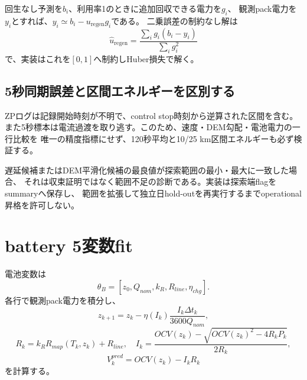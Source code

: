 
回生なし予測を$b_i$、利用率1のときに追加回収できる電力を$g_i$、
観測pack電力を$y_i$とすれば、$y_i\simeq b_i-u_{\mathrm{regen}}g_i$である。
二乗誤差の制約なし解は
\[
\hat u_{\mathrm{regen}}=
\frac{\sum_i g_i(b_i-y_i)}{\sum_i g_i^2}
\]
で、実装はこれを$[0,1]$へ制約しHuber損失で解く。


\subsection{5秒同期誤差と区間エネルギーを区別する}
ZPログは記録開始時刻が不明で、control stop時刻から逆算された区間を含む。
また5秒標本は電流過渡を取り逃す。このため、速度・DEM勾配・電池電力の一行比較を
唯一の精度指標にせず、120秒平均と10/25 km区間エネルギーも必ず検証する。


遅延候補またはDEM平滑化候補の最良値が探索範囲の最小・最大に一致した場合、
それは収束証明ではなく範囲不足の診断である。実装は探索端flagをsummaryへ保存し、
範囲を拡張して独立日hold-outを再実行するまでoperational昇格を許可しない。

\section{battery 5変数fit}
電池変数は
\[
\theta_B=[z_0,Q_{nom},k_R,R_{line},\eta_{chg}].
\]
各行で観測pack電力を積分し、
\[
z_{k+1}=z_k-\eta(I_k)\frac{I_k\Delta t_k}{3600Q_{nom}},
\]
\[
R_k=k_RR_{map}(T_k,z_k)+R_{line},\quad
I_k=\frac{OCV(z_k)-\sqrt{OCV(z_k)^2-4R_kP_k}}{2R_k},
\]
\[
V_k^{pred}=OCV(z_k)-I_kR_k
\]
を計算する。

